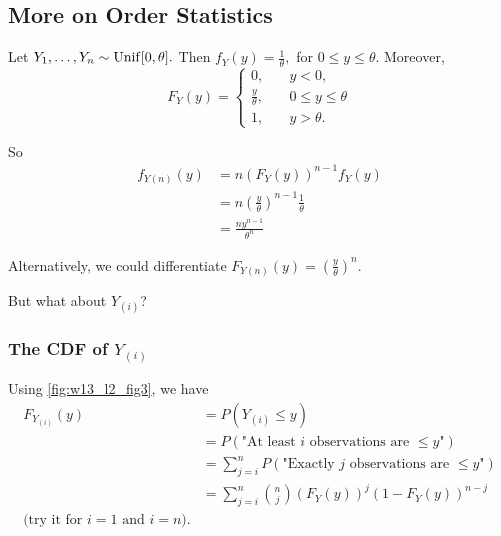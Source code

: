 
\subsection{More on Order Statistics}
\begin{eg}
\label{eg:Yn}
		Let $Y_1,\ldots,Y_n\sim \operatorname*{Unif}[0,\theta].$ Then $f_Y(y)=\frac{1}{\theta},$ for $0\leq y\leq \theta.$ Moreover,
$$
F_Y(y)=\begin{cases}
0, \quad &y<0, \\
\frac{y}{\theta}, \quad & 0\leq y\leq \theta \\
1, \quad &y>\theta.
\end{cases}
$$

So 
\begin{align*}
    f_{Y(n)}(y)&=n(F_Y(y))^{n-1}f_Y(y) \\
    &=n\left(\frac{y}{\theta}\right)^{n-1}\frac{1}{\theta} \\
    &=\frac{ny^{n-1}}{\theta^n}
\end{align*}
\begin{note}Alternatively, we could differentiate $F_{Y(n)}(y)=\left(\frac{y}{\theta}\right)^n.$
\end{note}


But what about $Y_{(i)}$?

\subsubsection{\texorpdfstring{The CDF of $Y_{(i)}$}{The CDF of an order statistic}}



Using \autoref{fig:w13_l2_fig3}, we have
\begin{align*}
		F_{Y_{(i)}}(y)&=P(Y_{(i)}\leq y) \\
    &=P(\text{"At least $i$ observations are $\leq y$"}) \\
    &=\sum_{j=i}^nP(\text{"Exactly $j$ observations are $\leq y$"}) \\
    &=\sum_{j=i}^n \binom{n}{j} (F_Y(y))^j(1-F_Y(y))^{n-j} \\
    \text{(try it for $i=1$ and $i=n$).}
\end{align*}
\end{eg}

